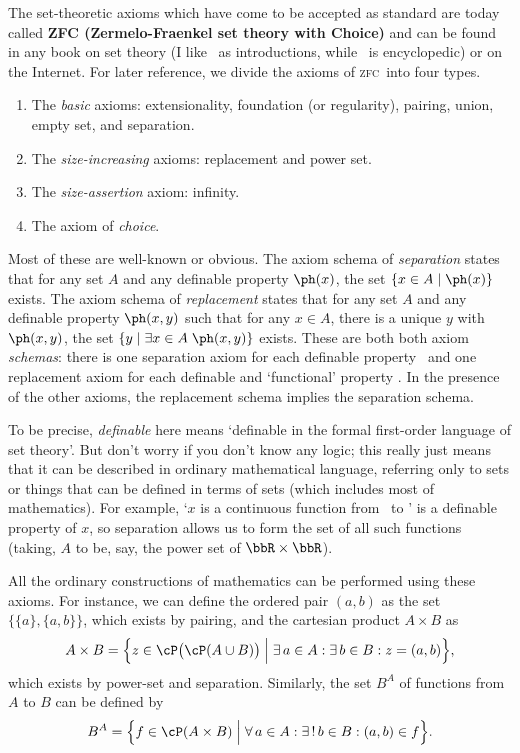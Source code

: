 \documentclass{amsart}
\def\zfc{\textsc{zfc}}
\begin{document}
The set-theoretic axioms which have come to be accepted as standard
are today called \textbf{ZFC (Zermelo-Fraenkel set theory with
  Choice)} and can be found in any book on set theory (I
like~\cite{devlin:joy-of-sets,enderton:set-theory} as introductions,
while~\cite{jech:set-theory} is encyclopedic) or on the Internet.  For
later reference, we divide the axioms of \zfc\ into four types.
\begin{enumerate}
\item The \emph{basic} axioms: extensionality, foundation (or
  regularity), pairing, union, empty set, and separation.
\item The \emph{size-increasing} axioms: replacement and power set.
\item The \emph{size-assertion} axiom: infinity.
\item The axiom of \emph{choice}.
\end{enumerate}
Most of these are well-known or obvious.  The axiom schema of
\emph{separation} states that for any set $A$ and any definable
property $\ph(x)$, the set $\{x\in A \mid \ph(x)\}$ exists.  The axiom
schema of \emph{replacement} states that for any set $A$ and any
definable property $\ph(x,y)$ such that for any $x\in A$, there is a
unique $y$ with $\ph(x,y)$, the set $\{y\mid \exists x\in
A\;\ph(x,y)\}$ exists.  These are both both axiom \emph{schemas}:
there is one separation axiom for each definable property \ph\ and one
replacement axiom for each definable and `functional' property \ph.
In the presence of the other axioms, the replacement schema implies
the separation schema.

To be precise, \emph{definable} here means `definable in the formal
first-order language of set theory'.  But don't worry if you don't
know any logic; this really just means that it can be described in
ordinary mathematical language, referring only to sets or things that
can be defined in terms of sets (which includes most of mathematics).
For example, `$x$ is a continuous function from \bbR\ to \bbR' is a
definable property of $x$, so separation allows us to form the set of
all such functions (taking, $A$ to be, say, the power set of
$\bbR\times\bbR$).

All the ordinary constructions of mathematics can be performed using
these axioms.  For instance, we can define the ordered pair $(a,b)$ as
the set $\{\{a\}, \{a,b\}\}$, which exists by pairing, and
the cartesian product $A\times B$ as
\[A\times B = \Big\{ z \in \cP\big(\cP(A\cup B)\big) \;\Big|\;
\exists \,a\in A : \exists\, b\in B : z = (a,b)
\Big\},
\]
which exists by power-set and separation.  Similarly, the set $B^A$ of
functions from $A$ to $B$ can be defined by
\[B^A = \Big\{ f \in \cP(A\times B) \;\Big|\;
\forall\, a\in A: \exists\,!\, b\in B : (a,b)\in f
\Big\}.
\]
\end{document}
